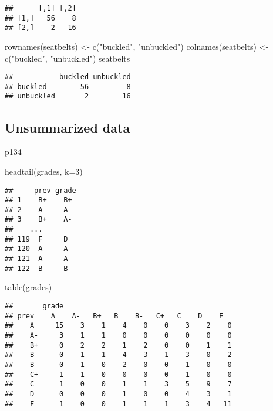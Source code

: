 \documentclass[
]{book}
\newenvironment{Shaded}{\begin{snugshade}}{\end{snugshade}}
\newcommand{\AttributeTok}[1]{\textcolor[rgb]{0.77,0.63,0.00}{#1}}
\newcommand{\DecValTok}[1]{\textcolor[rgb]{0.00,0.00,0.81}{#1}}
\newcommand{\FunctionTok}[1]{\textcolor[rgb]{0.00,0.00,0.00}{#1}}
\newcommand{\NormalTok}[1]{#1}
\newcommand{\OtherTok}[1]{\textcolor[rgb]{0.56,0.35,0.01}{#1}}
\newcommand{\StringTok}[1]{\textcolor[rgb]{0.31,0.60,0.02}{#1}}
\theoremstyle{definition}
\theoremstyle{definition}
\theoremstyle{definition}
\theoremstyle{definition}
\theoremstyle{remark}
\begin{document}
\begin{verbatim}
##      [,1] [,2]
## [1,]   56    8
## [2,]    2   16
\end{verbatim}

\begin{Shaded}
\begin{Highlighting}[]
\FunctionTok{rownames}\NormalTok{(seatbelts) }\OtherTok{\textless{}{-}} \FunctionTok{c}\NormalTok{(}\StringTok{"buckled"}\NormalTok{, }\StringTok{"unbuckled"}\NormalTok{)}
\FunctionTok{colnames}\NormalTok{(seatbelts) }\OtherTok{\textless{}{-}} \FunctionTok{c}\NormalTok{(}\StringTok{"buckled"}\NormalTok{, }\StringTok{"unbuckled"}\NormalTok{)}
\NormalTok{seatbelts}
\end{Highlighting}
\end{Shaded}

\begin{verbatim}
##           buckled unbuckled
## buckled        56         8
## unbuckled       2        16
\end{verbatim}

\hypertarget{unsummarized-data}{%
\subsection{Unsummarized data}\label{unsummarized-data}}

p134

\begin{Shaded}
\begin{Highlighting}[]
\FunctionTok{headtail}\NormalTok{(grades, }\AttributeTok{k=}\DecValTok{3}\NormalTok{)}
\end{Highlighting}
\end{Shaded}

\begin{verbatim}
##     prev grade
## 1    B+    B+ 
## 2    A-    A- 
## 3    B+    A- 
##    ...
## 119  F     D  
## 120  A     A- 
## 121  A     A  
## 122  B     B
\end{verbatim}

\begin{Shaded}
\begin{Highlighting}[]
\FunctionTok{table}\NormalTok{(grades)}
\end{Highlighting}
\end{Shaded}

\begin{verbatim}
##       grade
## prev    A    A-   B+   B    B-   C+   C    D    F  
##    A     15    3    1    4    0    0    3    2    0
##    A-     3    1    1    0    0    0    0    0    0
##    B+     0    2    2    1    2    0    0    1    1
##    B      0    1    1    4    3    1    3    0    2
##    B-     0    1    0    2    0    0    1    0    0
##    C+     1    1    0    0    0    0    1    0    0
##    C      1    0    0    1    1    3    5    9    7
##    D      0    0    0    1    0    0    4    3    1
##    F      1    0    0    1    1    1    3    4   11
\end{verbatim}
\end{document}
